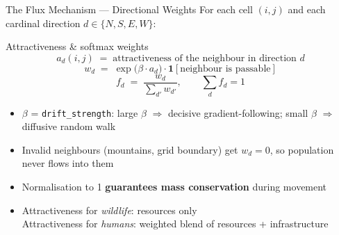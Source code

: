 \documentclass[aspectratio=169]{beamer}
\begin{document}
\begin{frame}{The Flux Mechanism — Directional Weights}
  For each cell $(i,j)$ and each cardinal direction $d \in \{N,S,E,W\}$:
  \vspace{0.4em}

  \begin{block}{Attractiveness \& softmax weights}
    \[
      a_d(i,j) \;=\; \text{attractiveness of the neighbour in direction } d
    \]
    \[
      w_d \;=\; \exp\!\bigl(\beta\cdot a_d\bigr)\cdot
                \mathbf{1}[\text{neighbour is passable}]
    \]
    \[
      f_d \;=\; \frac{w_d}{\displaystyle\sum_{d'} w_{d'}},
      \qquad \sum_d f_d = 1
    \]
  \end{block}

  \begin{itemize}
    \item $\beta$ = \texttt{drift\_strength}: large $\beta$ $\Rightarrow$ decisive
          gradient-following; small $\beta$ $\Rightarrow$ diffusive random walk
    \item Invalid neighbours (mountains, grid boundary) get $w_d = 0$, so
          population never flows into them
    \item Normalisation to 1 \textbf{guarantees mass conservation} during movement
    \item Attractiveness for \emph{wildlife}: resources only\\
          Attractiveness for \emph{humans}: weighted blend of resources +
          infrastructure
  \end{itemize}
\end{frame}
\end{document}
